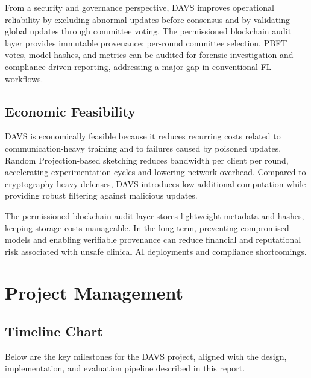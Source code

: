 From a security and governance perspective, DAVS improves operational reliability by excluding abnormal updates before consensus and by validating global updates through committee voting. The permissioned blockchain audit layer provides immutable provenance: per-round committee selection, PBFT votes, model hashes, and metrics can be audited for forensic investigation and compliance-driven reporting, addressing a major gap in conventional FL workflows.
\subsection{Economic Feasibility}
DAVS is economically feasible because it reduces recurring costs related to communication-heavy training and to failures caused by poisoned updates. Random Projection-based sketching reduces bandwidth per client per round, accelerating experimentation cycles and lowering network overhead. Compared to cryptography-heavy defenses, DAVS introduces low additional computation while providing robust filtering against malicious updates.

The permissioned blockchain audit layer stores lightweight metadata and hashes, keeping storage costs manageable. In the long term, preventing compromised models and enabling verifiable provenance can reduce financial and reputational risk associated with unsafe clinical AI deployments and compliance shortcomings.


\section{Project Management}
\subsection{Timeline Chart}
Below are the key milestones for the DAVS project, aligned with the design, implementation, and evaluation pipeline described in this report.

